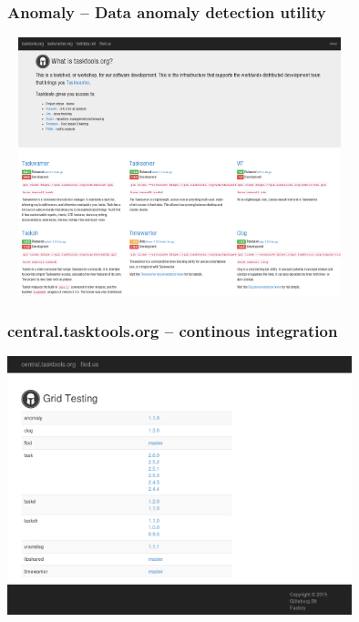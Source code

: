 \documentclass[t,handout]{beamer}
\begin{document}
\begin{frame}\frametitle{Anomaly -- Data anomaly detection utility}
    \begin{center}
        \href{http://tasktools.org/projects/anomaly.html}{\includegraphics[width=10cm,height=7.5cm]{tasktools-org.png}}
    \end{center}
\end{frame}

\begin{frame}\frametitle{central.tasktools.org -- continous integration}
    \begin{center}
        \href{http://central.tasktools.org/}{\includegraphics[width=10cm,height=7.5cm]{central-tasktools-org.png}}
    \end{center}
\end{frame}
\end{document}
